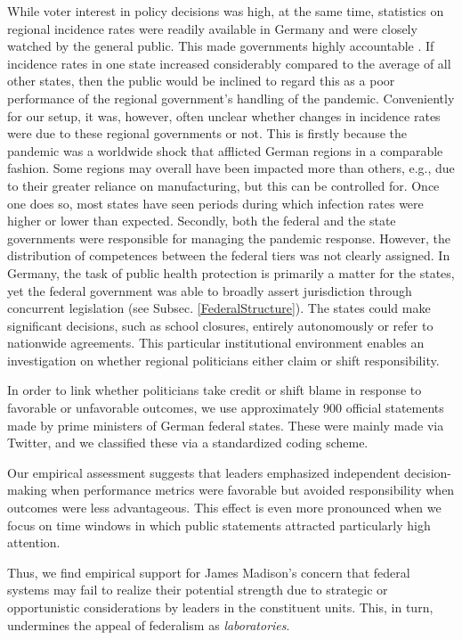\documentclass[authoryear,12pt, 3p]{elsarticle}
\theoremstyle{break}
\begin{document}
While voter interest in policy decisions was high, at the same time, statistics on regional incidence rates were readily available in Germany and were closely watched by the general public. This made governments highly accountable \citep{Neundorf2021, Algara2022, Singer2022, Kennedy2022}. If incidence rates in one state increased considerably compared to the average of all other states, then the public would be inclined to regard this as a poor performance of the regional government’s handling of the pandemic. Conveniently for our setup, it was, however, often unclear whether changes in incidence rates were due to these regional governments or not. This is firstly because the pandemic was a worldwide shock that afflicted German regions in a comparable fashion. Some regions may overall have been impacted more than others, e.g., due to their greater reliance on manufacturing, but this can be controlled for. Once one does so, most states have seen periods during which infection rates were higher or lower than expected. Secondly, both the federal and the state governments were responsible for managing the pandemic response. However, the distribution of competences between the federal tiers was not clearly assigned. In Germany, the task of public health protection is primarily a matter for the states, yet the federal government was able to broadly assert jurisdiction through concurrent legislation (see Subsec. \ref{FederalStructure}). The states could make significant decisions, such as school closures, entirely autonomously or refer to nationwide agreements. This particular institutional environment enables an investigation on whether regional politicians either claim or shift responsibility. 

In order to link whether politicians take credit or shift blame in response to favorable or unfavorable outcomes, we use approximately 900 official statements made by prime ministers of German federal states. These were mainly made via Twitter, and we classified these via a standardized coding scheme.

Our empirical assessment suggests that leaders emphasized independent decision-making when performance metrics were favorable but avoided responsibility when outcomes were less advantageous. This effect is even more pronounced when we focus on time windows in which public statements attracted particularly high attention.

Thus, we find empirical support for James Madison’s concern that federal systems may fail to realize their potential strength due to strategic or opportunistic considerations by leaders in the constituent units. This, in turn, undermines the appeal of federalism as \textit{laboratories}.
\end{document}
